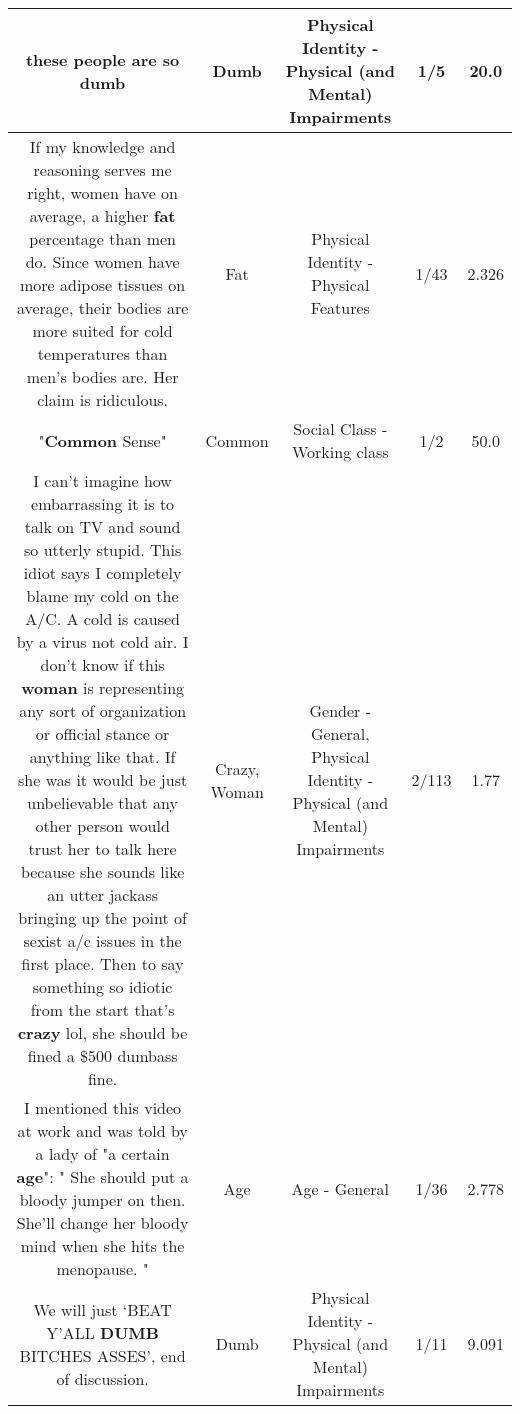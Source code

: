 \documentclass[11pt]{article}
\newlength\mylength
\begin{document}
\begin{center}
\begin{longtable}{|C{.65\mylength}|C{.30\mylength}|C{.12\mylength}|C{.12\mylength}|C{.12\mylength}|}
  \small these people are so dumb\normalsize   & Dumb & Physical Identity - Physical (and Mental) Impairments & 1/5 & 20.0 \\  \hline
  \small If my knowledge and reasoning serves me right, women have on average, a higher \textbf{fat} percentage than men do. Since women have more adipose tissues on average, their bodies are more suited for cold temperatures than men's bodies are. Her claim is ridiculous.\normalsize   & Fat & Physical Identity - Physical Features & 1/43 & 2.326 \\  \hline
  \small "\textbf{Common} Sense"\normalsize   & Common & Social Class - Working class & 1/2 & 50.0 \\  \hline
  \small I can't imagine how embarrassing it is to talk on TV and sound so utterly stupid. This idiot says I completely blame my cold on the A/C. A cold is caused by a virus not cold air. I don't know if this \textbf{woman} is representing any sort of organization or official stance or anything like that. If she was it would be just unbelievable that any other person would trust her to talk here because she sounds like an utter jackass bringing up the point of sexist a/c issues in the first place. Then to say something so idiotic from the start that's \textbf{crazy} lol, she should be fined a \$500 dumbass fine.\normalsize   & Crazy, Woman & Gender - General, Physical Identity - Physical (and Mental) Impairments & 2/113 & 1.77 \\  \hline
  \small I mentioned this video at work and was told by a lady of "a certain \textbf{age}": " She should put a bloody jumper on then.  She'll change her bloody mind when she hits the menopause. "\normalsize   & Age & Age - General & 1/36 & 2.778 \\  \hline
  \small We will just ‘BEAT Y'ALL \textbf{DUMB} BITCHES ASSES', end of discussion.\normalsize   & Dumb & Physical Identity - Physical (and Mental) Impairments & 1/11 & 9.091 \\  \hline

\end{longtable}
\end{center}
\end{document}
